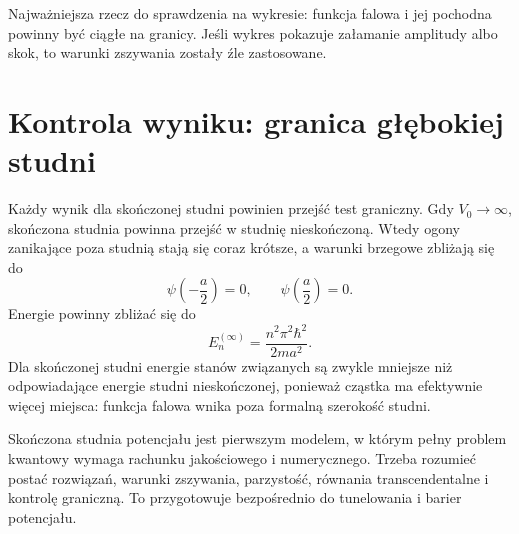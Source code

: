 Najważniejsza rzecz do sprawdzenia na wykresie: funkcja falowa i jej pochodna powinny być ciągłe na granicy. Jeśli wykres pokazuje załamanie amplitudy albo skok, to warunki zszywania zostały źle zastosowane.

\section{Kontrola wyniku: granica głębokiej studni}

Każdy wynik dla skończonej studni powinien przejść test graniczny. Gdy \(V_0\to\infty\), skończona studnia powinna przejść w studnię nieskończoną. Wtedy ogony zanikające poza studnią stają się coraz krótsze, a warunki brzegowe zbliżają się do
\[
    \psi\left(-\frac{a}{2}\right)=0,
    \qquad
    \psi\left(\frac{a}{2}\right)=0.
\]
Energie powinny zbliżać się do
\begin{equation}
    E_n^{(\infty)}=\frac{n^2\pi^2\hbar^2}{2ma^2}.
\end{equation}
Dla skończonej studni energie stanów związanych są zwykle mniejsze niż odpowiadające energie studni nieskończonej, ponieważ cząstka ma efektywnie więcej miejsca: funkcja falowa wnika poza formalną szerokość studni.

\begin{summarybox}
Skończona studnia potencjału jest pierwszym modelem, w którym pełny problem kwantowy wymaga rachunku jakościowego i numerycznego. Trzeba rozumieć postać rozwiązań, warunki zszywania, parzystość, równania transcendentalne i kontrolę graniczną. To przygotowuje bezpośrednio do tunelowania i barier potencjału.
\end{summarybox}
